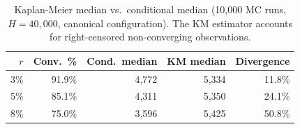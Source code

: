 \begin{table}[htbp]
\centering
\caption{Kaplan-Meier median vs.\ conditional median (10{,}000 MC runs, $H = 40{,}000$, canonical configuration). The KM estimator accounts for right-censored non-converging observations.}
\label{tab:kaplan_meier}
\small
\begin{tabular}{@{}rrrrr@{}}
\toprule
$r$ & Conv.\ \% & Cond.\ median & KM median & Divergence \\
\midrule
3\%  & 91.9\% & 4{,}772 & 5{,}334  & 11.8\% \\
5\%  & 85.1\% & 4{,}311 & 5{,}350  & 24.1\% \\
8\%  & 75.0\% & 3{,}596 & 5{,}425  & 50.8\% \\
\bottomrule
\end{tabular}
\end{table}
